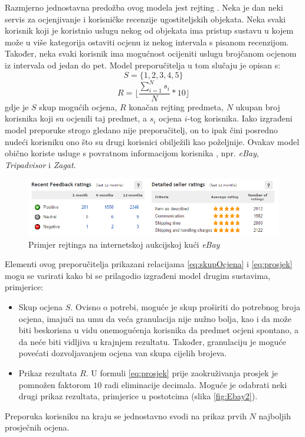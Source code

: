 \documentclass[times, utf8, diplomski, numeric]{fer}
\begin{document}
Razmjerno jednostavna predožba ovog modela jest rejting . Neka je
dan neki servis za ocjenjivanje i korisničke recenzije ugostiteljskih objekata.
Neka svaki korisnik koji je koristnio uslugu nekog od objekata ima pristup
sustavu u kojem može u više kategorija ostaviti ocjenu iz nekog intervala s
pisanom recenzijom. Također, neka svaki korisnik ima mogućnost ocijeniti uslugu
brojčanom ocjenom iz intervala od jedan do pet. Model preporučitelja u tom
slučaju je opisan s:
\begin{equation}
\label{eq:skupOcjena}
	S = \{1, 2, 3, 4, 5\}
\end{equation}
\begin{equation}
\label{eq:prosjek}
	R = \lfloor \frac{\sum_{i=1}^{N} s_i}{N} \ast 10 \rfloor
\end{equation}
gdje je $S$ skup mogućih ocjena, $R$ konačan rejting predmeta, $N$ ukupan broj
korisnika koji su ocjenili taj predmet, a $s_i$ ocjena $i$-tog korisnika. Iako
izgrađeni model preporuke strogo gledano nije preporučitelj, on to ipak čini
posredno nudeći korisniku ono što su drugi korisnici obilježili kao poželjnije.
Ovakav model obično koriste usluge s povratnom informacijom korisnika
, npr. \emph{eBay}, \emph{Tripadvisor} i \emph{Zagat}.

\begin{figure}[htb]
	\centering
	\includegraphics[width=14.21cm]{images/neosobni/ebay1.png}
	\caption{Primjer rejtinga na internetskoj aukcijskoj kući \emph{eBay}}
	\label{fig:Ebay1}
\end{figure}

Elementi ovog preporučitelja prikazani relacijama \ref{eq:skupOcjena} i
\ref{eq:prosjek} mogu se varirati kako bi se prilagodio izgrađeni model drugim
sustavima, primjerice:
\begin{itemize}
  \item Skup ocjena $S$. Ovisno o potrebi, moguće je skup proširiti do potrebnog
  broja ocjena, imajući na umu da veća granulacija nije nužno bolja, kao i da
  može biti beskorisna u vidu onemogućenja korisnika da predmet ocjeni spontano,
  a da neće biti vidljiva u krajnjem rezultatu. Također, granulaciju je moguće
  povećati dozvoljavanjem ocjena van skupa cijelih brojeva.
  \item Prikaz rezultata $R$. U formuli \ref{eq:prosjek} prije zaokruživanja
  prosjek je pomnožen faktorom $10$ radi eliminacije decimala. Moguće je
  odabrati neki drugi prikaz rezultata, primjerice u postotcima (slika
  	\ref{fig:Ebay2}).
\end{itemize}
Preporuka korisniku na kraju se jednostavno svodi na prikaz prvih $N$ najboljih
prosječnih ocjena.
\end{document}
